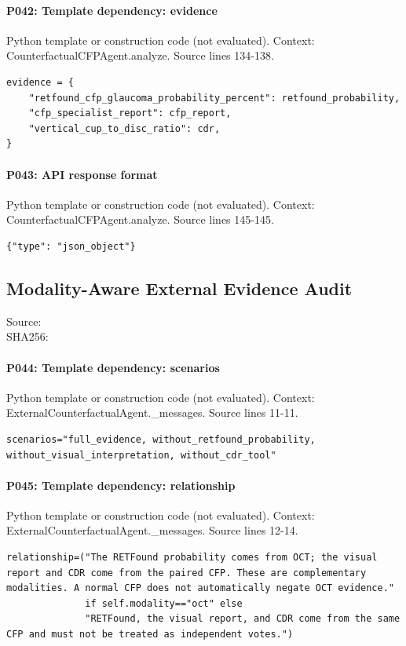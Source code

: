 \documentclass[10pt]{article}
\begin{document}
\paragraph{P042: Template dependency: evidence}
Python template or construction code (not evaluated). Context: CounterfactualCFPAgent.analyze. Source lines 134-138.
\begin{Verbatim}
evidence = {
    "retfound_cfp_glaucoma_probability_percent": retfound_probability,
    "cfp_specialist_report": cfp_report,
    "vertical_cup_to_disc_ratio": cdr,
}
\end{Verbatim}
\paragraph{P043: API response format}
Python template or construction code (not evaluated). Context: CounterfactualCFPAgent.analyze. Source lines 145-145.
\begin{Verbatim}
{"type": "json_object"}
\end{Verbatim}
\subsection{Modality-Aware External Evidence Audit}
Source: \\
SHA256: {\scriptsize{}}
\paragraph{P044: Template dependency: scenarios}
Python template or construction code (not evaluated). Context: ExternalCounterfactualAgent.\_messages. Source lines 11-11.
\begin{Verbatim}
scenarios="full_evidence, without_retfound_probability, without_visual_interpretation, without_cdr_tool"
\end{Verbatim}
\paragraph{P045: Template dependency: relationship}
Python template or construction code (not evaluated). Context: ExternalCounterfactualAgent.\_messages. Source lines 12-14.
\begin{Verbatim}
relationship=("The RETFound probability comes from OCT; the visual report and CDR come from the paired CFP. These are complementary modalities. A normal CFP does not automatically negate OCT evidence."
              if self.modality=="oct" else
              "RETFound, the visual report, and CDR come from the same CFP and must not be treated as independent votes.")
\end{Verbatim}
\end{document}
